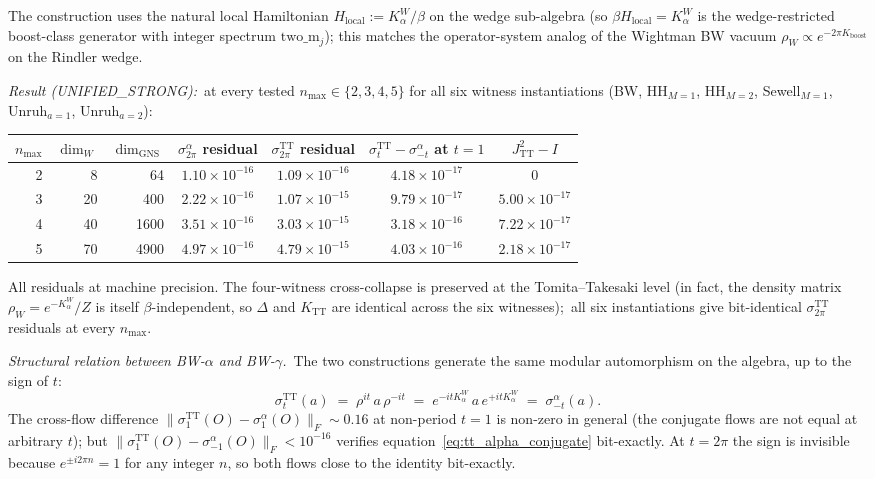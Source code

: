 \documentclass[11pt]{article}
\begin{document}
The construction uses the natural local Hamiltonian $H_{\mathrm{local}}
:= K_{\alpha}^W / \beta$ on the wedge sub-algebra (so $\beta
H_{\mathrm{local}} = K_{\alpha}^W$ is the wedge-restricted boost-class
generator with integer spectrum $\mathrm{two\_m}_j$); this matches the
operator-system analog of the Wightman BW vacuum $\rho_W \propto
e^{-2\pi K_{\mathrm{boost}}}$ on the Rindler wedge.

\emph{Result (UNIFIED\_STRONG):}\ at every tested $n_{\max} \in \{2, 3,
4, 5\}$ for all six witness instantiations (BW, HH$_{M=1}$, HH$_{M=2}$,
Sewell$_{M=1}$, Unruh$_{a=1}$, Unruh$_{a=2}$):

\begin{center}
\begin{tabular}{rrrcccc}
\toprule
$n_{\max}$ & $\dim_W$ & $\dim_{\mathrm{GNS}}$
& $\sigma^{\alpha}_{2\pi}$ residual & $\sigma^{\mathrm{TT}}_{2\pi}$ residual
& $\sigma_t^{\mathrm{TT}} - \sigma_{-t}^{\alpha}$ at $t=1$ & $J_{\mathrm{TT}}^2 - I$\\
\midrule
2 & 8  & 64   & $1.10 \times 10^{-16}$ & $1.09 \times 10^{-16}$ & $4.18 \times 10^{-17}$ & $0$\\
3 & 20 & 400  & $2.22 \times 10^{-16}$ & $1.07 \times 10^{-15}$ & $9.79 \times 10^{-17}$ & $5.00 \times 10^{-17}$\\
4 & 40 & 1600 & $3.51 \times 10^{-16}$ & $3.03 \times 10^{-15}$ & $3.18 \times 10^{-16}$ & $7.22 \times 10^{-17}$\\
5 & 70 & 4900 & $4.97 \times 10^{-16}$ & $4.79 \times 10^{-15}$ & $4.03 \times 10^{-16}$ & $2.18 \times 10^{-17}$\\
\bottomrule
\end{tabular}
\end{center}

All residuals at machine precision.  The four-witness cross-collapse is
preserved at the Tomita--Takesaki level (in fact, the density matrix
$\rho_W = e^{-K_\alpha^W}/Z$ is itself $\beta$-independent, so $\Delta$
and $K_{\mathrm{TT}}$ are identical across the six witnesses);\ all
six instantiations give bit-identical $\sigma^{\mathrm{TT}}_{2\pi}$
residuals at every $n_{\max}$.

\emph{Structural relation between BW-$\alpha$ and BW-$\gamma$.}\ The two
constructions generate the same modular automorphism on the algebra,
up to the sign of $t$:
\begin{equation}
\sigma_t^{\mathrm{TT}}(a) \;=\; \rho^{it}\, a\, \rho^{-it}
\;=\; e^{-it K_\alpha^W}\, a\, e^{+it K_\alpha^W}
\;=\; \sigma_{-t}^{\alpha}(a).
\label{eq:tt_alpha_conjugate}
\end{equation}
The cross-flow difference $\|\sigma_1^{\mathrm{TT}}(O) -
\sigma_1^{\alpha}(O)\|_F \sim 0.16$ at non-period $t = 1$ is non-zero
in general (the conjugate flows are not equal at arbitrary $t$); but
$\|\sigma_1^{\mathrm{TT}}(O) - \sigma_{-1}^{\alpha}(O)\|_F < 10^{-16}$
verifies equation~\eqref{eq:tt_alpha_conjugate} bit-exactly.  At $t =
2\pi$ the sign is invisible because $e^{\pm i 2\pi n} = 1$ for any
integer $n$, so both flows close to the identity bit-exactly.
\end{document}

